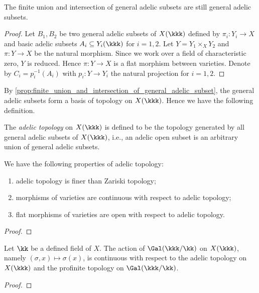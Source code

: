     \begin{lemma}\label{prop:finite_union_and_intersection_of_general_adelic_subset}
        The finite union and intersection of general adelic subsets are still general adelic subsets.
    \end{lemma}
    \begin{proof}
        Let \(B_1,B_2\) be two general adelic subsets of \(X(\kkk)\) defined by \(\pi_i: Y_i \to X\) and basic adelic subsets \(A_i \subseteq Y_i(\kkk)\) for \(i=1,2\).
        Let \(Y = Y_1 \times_X Y_2\) and \(\pi: Y \to X\) be the natural morphism.
        Since we work over a field of characteristic zero, \(Y\) is reduced.
        Hence \(\pi: Y \to X\) is a flat morphism between varieties.
        Denote by \(C_i = p_i^{-1}(A_i)\) with \(p_i: Y \to Y_i\) the natural projection for \(i=1,2\).

    \end{proof}


    By \cref{prop:finite_union_and_intersection_of_general_adelic_subset}, the general adelic subsets form a basis of topology on \(X(\kkk)\).
    Hence we have the following definition.

    \begin{definition}\label{def:adelit_topology}
        The \emph{adelic topology} on \(X(\kkk)\) is defined to be the topology generated by all general adelic subsets of \(X(\kkk)\),
        i.e., an adelic open subset is an arbitrary union of general adelic subsets.
    \end{definition}

    \begin{proposition}\label{prop:basic_properties_of_adelic_topology}
        We have the following properties of adelic topology:
        \begin{enumerate}
            \item adelic topology is finer than Zariski topology;
            \item morphisms of varieties are continuous with respect to adelic topology;
            \item flat morphisms of varieties are open with respect to adelic topology.
        \end{enumerate}
    \end{proposition}
    \begin{proof}
    \end{proof}

    \begin{proposition}\label{prop:galois_action_is_continuous_wrt_adelic_and_profinite_topo}
        Let \(\kk\) be a defined field of \(X\).
        The action of \(\Gal(\kkk/\kk)\) on \(X(\kkk)\), namely \((\sigma,x) \mapsto \sigma(x)\), is continuous with respect to the adelic topology on \(X(\kkk)\) and the profinite topology on \(\Gal(\kkk/\kk)\).
    \end{proposition}
    \begin{proof}
    \end{proof}

